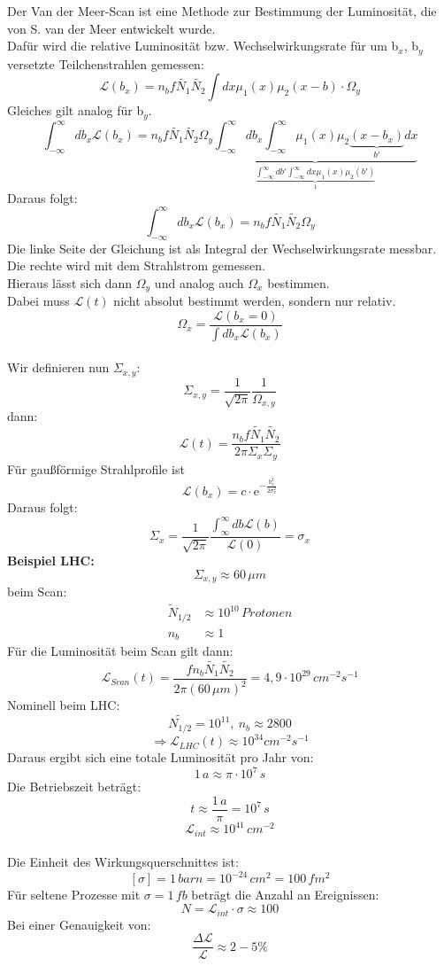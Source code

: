 Der Van der Meer-Scan ist eine Methode zur Bestimmung der Luminosität, die von 
S. van der Meer entwickelt wurde. \\
Dafür wird die relative Luminosität bzw. Wechselwirkungsrate für um b$_x$, 
b$_y$ versetzte Teilchenstrahlen gemessen:
\[ \mathcal{L}(b_x) = n_b f \tilde{N_1} \tilde{N_2} \int dx \mu_1 (x) \mu_2 
(x-b) \cdot \Omega_y \]
Gleiches gilt analog für b$_y$. \\
\[ \int_{-\infty}^{\infty} db_x \mathcal{L} (b_x) = n_b f \tilde{N_1} 
\tilde{N_2} \Omega_y \underbrace{\int_{-\infty}^{\infty} db_x 
\int_{-\infty}^{\infty} \mu_1 (x) \mu_2 \underbrace{(x-b_x)}_{b'} 
dx}_{\underbrace{\int_{-\infty}^{\infty} db' \int_{-\infty}^{\infty} dx 
\mu_1(x) \mu_2(b')}_{1}} \]
Daraus folgt: 
\[ \int_{-\infty}^{\infty} db_x \mathcal{L}(b_x) = n_b f \tilde{N_1} 
\tilde{N_2} \Omega_y \]
Die linke Seite der Gleichung ist als Integral der Wechselwirkungsrate messbar. 
Die rechte wird mit dem Strahlstrom gemessen. \\
Hieraus lässt sich dann $\Omega_y$ und analog auch $\Omega_x$ bestimmen. \\
Dabei muss $\mathcal{L}(t)$ nicht absolut bestimmt werden, sondern nur relativ. 
\[ \Omega_x = \frac{\mathcal{L} (b_x = 0)}{\int db_x \mathcal{L}(b_x)} \]
\\
Wir definieren nun $\Sigma_{x,y}$:
\[ \Sigma_{x,y} = \frac{1}{\sqrt{2 \pi}} \frac{1}{\Omega_{x,y}} \]
dann:
\[ \mathcal{L} (t) = \frac{n_b f \tilde{N_1} \tilde{N_2}}{2 \pi \Sigma_x 
\Sigma_y} \]
Für gaußförmige Strahlprofile ist
\[ \mathcal{L} (b_x) = c \cdot \mathrm{e}^{- \frac{b_x^2}{2 \sigma_x^2}} \] 
Daraus folgt: 
\[ \Sigma_x = \frac{1}{\sqrt{2 \pi}} \frac{\int_{\infty}^{\infty}db 
\mathcal{L}(b)}{\mathcal{L}(0)} = \sigma_x \]
\textbf{Beispiel LHC:} 
\[ \Sigma_{x,y} \approx 60\,\mu m \]
beim Scan: 
\begin{align*}
\tilde{N}_{1/2} &\approx 10^{10}\, \mathit{Protonen} \\
n_b &\approx 1
\end{align*}
Für die Luminosität beim Scan gilt dann:
\[ \mathcal{L}_{Scan} (t) = \frac{f n_b \tilde{N_1} \tilde{N_2}}{2 \pi (60\,\mu 
m )^2} = 4,9 \cdot 10^{29}\,cm^{-2} s^{-1} \]
Nominell beim LHC:
\[ \tilde{N_{1/2}} = 10^{11},\ n_b \approx 2800 \]
\[ \Longrightarrow \mathcal{L}_{LHC} (t) \approx 10^{34} cm^{-2} s^{-1} \]
Daraus ergibt sich eine totale Luminosität pro Jahr von:
\[ 1\,a \approx \pi \cdot 10^7\,s \]
Die Betriebszeit beträgt:
\[ t \approx \frac{1\,a}{\pi} = 10^7\,s \]
\[ \mathcal{L}_{int} \approx 10^{41}\,cm^{-2} \]
\\
Die Einheit des Wirkungsquerschnittes ist:
\[ [\sigma] = 1\,\mathit{barn} = 10^{-24}\,cm^{2} = 100\, fm^2 \]
Für seltene Prozesse mit $\sigma = 1\,fb$ beträgt die Anzahl an Ereignissen:
\[ N = \mathcal{L}_{int} \cdot \sigma \approx 100 \]
Bei einer Genauigkeit von:
\[ \frac{\Delta \mathcal{L}}{\mathcal{L}} \approx 2-5\% \]

